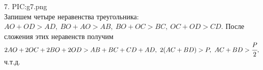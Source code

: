 7. {{PIC:g7.png}}\\
Запишем четыре неравенства треугольника: $AO+OD>AD,\ BO+AO>AB,\ BO+OC>BC,\ OC+OD>CD.$ После сложения этих неравенств получим $2AO+2OC+2BO+2OD>AB+BC+CD+AD,\ 2(AC+BD)>P,\ AC+BD>\cfrac{P}{2},$ ч.т.д.\\
